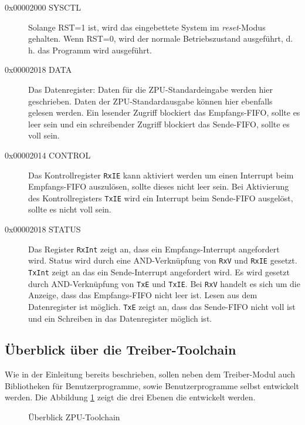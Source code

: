 \documentclass[11pt]{scrartcl}
\begin{document}
\begin{description}

    \item[0x00002000 SYSCTL]
    Solange RST=1 ist, wird das eingebettete System im \textit{reset}-Modus gehalten. Wenn RST=0, wird der normale Betriebszustand ausgeführt, d. h. das Programm wird ausgeführt.
    
     \item[0x00002018 DATA]
     Das Datenregister: Daten für die ZPU-Standardeingabe werden hier geschrieben. Daten der ZPU-Standardausgabe können hier ebenfalls gelesen werden. Ein lesender Zugriff blockiert das Empfangs-FIFO, sollte es leer sein und ein schreibender Zugriff blockiert das Sende-FIFO, sollte es voll sein.  
    
    \item[0x00002014 CONTROL]
    Das Kontrollregister \texttt{RxIE} kann aktiviert werden um einen Interrupt beim Empfangs-FIFO auszulösen, sollte dieses nicht leer sein. Bei Aktivierung des Kontrollregisters \texttt{TxIE} wird ein Interrupt beim Sende-FIFO ausgelöst, sollte es nicht voll sein. 
    
    \item[0x00002018 STATUS]
    Das Register \texttt{RxInt} zeigt an, dass ein Empfangs-Interrupt angefordert wird. Status wird durch eine AND-Verknüpfung von \texttt{RxV} und \texttt{RxIE} gesetzt. \texttt{TxInt} zeigt an das ein Sende-Interrupt angefordert wird. Es wird gesetzt durch AND-Verknüpfung von \texttt{TxE} und \texttt{TxIE}. Bei \texttt{RxV} handelt es sich um die Anzeige, dass das Empfangs-FIFO nicht leer ist. Lesen aus dem Datenregister ist möglich. \texttt{TxE} zeigt an, dass das Sende-FIFO nicht voll ist und ein Schreiben in das Datenregister möglich ist.
 
\end{description}

\subsection{Überblick über die Treiber-Toolchain}
Wie in der Einleitung bereits beschrieben, sollen neben dem Treiber-Modul auch Bibliotheken für Benutzerprogramme, sowie Benutzerprogramme selbst entwickelt werden. Die Abbildung \ref{zpu_overview} zeigt die drei Ebenen die entwickelt werden.

\begin{figure}
	\begin{center}
		
		\caption{Überblick ZPU-Toolchain}
		\label{zpu_overview}	
	\end{center}
\end{figure}
\end{document}
